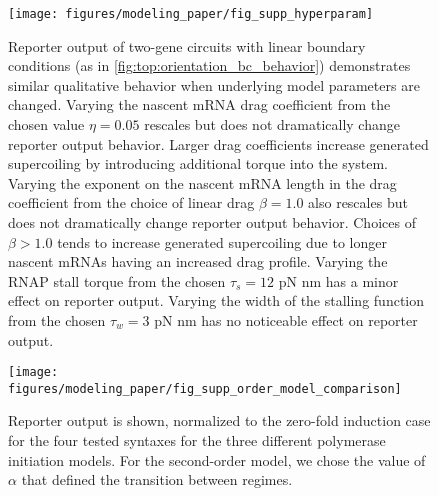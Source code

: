 \documentclass[11pt]{article}
\begin{document}
\begin{figure}[hbtp]
    \centering
    {\texttt{[image: figures/modeling\_paper/fig\_supp\_hyperparam]}
    \label{fig:hyperparam_drag_coeff}
    \label{fig:hyperparam_drag_exponent}
    \label{fig:hyperparam_stall_torque}
    \label{fig:hyperparam_stall_width}
    }
    \caption{Reporter output of two-gene circuits with linear boundary conditions (as in \cref{fig:top:orientation_bc_behavior}) demonstrates similar qualitative behavior when underlying model parameters are changed.
         Varying the nascent mRNA drag coefficient from the chosen value \(\eta = 0.05\) rescales but does not dramatically change reporter output behavior. Larger drag coefficients increase generated supercoiling by introducing additional torque into the system.
         Varying the exponent on the nascent mRNA length in the drag coefficient from the choice of linear drag \(\beta = 1.0\) also rescales but does not dramatically change reporter output behavior. Choices of \(\beta > 1.0\) tends to increase generated supercoiling due to longer nascent mRNAs having an increased drag profile.
         Varying the RNAP stall torque from the chosen \(\tau_s = 12\) pN nm has a minor effect on reporter output.
         Varying the width of the stalling function from the chosen \(\tau_w = 3\) pN nm has no noticeable effect on reporter output.
    }
    \label{fig:top:hyperparam}
\end{figure}

\begin{figure}[htbp]
    \centering
    {\texttt{[image: figures/modeling\_paper/fig\_supp\_order\_model\_comparison]}
    \label{fig:supp:initation_order_comparison}
    \label{fig:supp:alpha_reporter_counts}
    }
    \caption{
         Reporter output is shown, normalized to the zero-fold induction case for the four tested syntaxes for the three different polymerase initiation models.
         For the second-order model, we chose the value of \(\alpha\) that defined the transition between regimes.
    }
    \label{fig:top:supp_model_comparison}
\end{figure}
\end{document}
